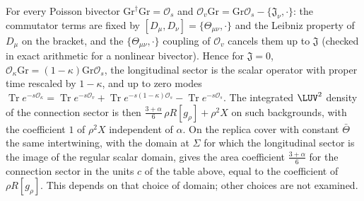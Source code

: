 For every Poisson bivector \(\mathrm{Gr}^\dagger\mathrm{Gr}=\mathcal O_s\) and \(\mathcal O_v\mathrm{Gr}=\mathrm{Gr}\mathcal O_s-\{\mathfrak J_\nu,\cdot\}\): the commutator terms are fixed by \([D_\mu,D_\nu]=\{\Theta_{\mu\nu},\cdot\}\) and the Leibniz property of \(D_\mu\) on the bracket, and the \(\{\Theta_{\mu\nu},\cdot\}\) coupling of \(\mathcal O_v\) cancels them up to \(\mathfrak J\) (checked in exact arithmetic for a nonlinear bivector). Hence for \(\mathfrak J=0\), \(\mathcal O_\kappa\mathrm{Gr}=(1-\kappa)\mathrm{Gr}\mathcal O_s\), the longitudinal sector is the scalar operator with proper time rescaled by \(1-\kappa\), and up to zero modes \(\operatorname{Tr}e^{-s\mathcal O_\kappa}=\operatorname{Tr}e^{-s\mathcal O_v}+\operatorname{Tr}e^{-s(1-\kappa)\mathcal O_s}-\operatorname{Tr}e^{-s\mathcal O_s}\). The integrated \(\LUV^2\) density of the connection sector is then \(\tfrac{3+\alpha}6\,\rho R[g_\rho]+\rho^2X\) on such backgrounds, with the coefficient \(1\) of \(\rho^2X\) independent of \(\alpha\). On the replica cover with constant \(\bar\Theta\) the same intertwining, with the domain at \(\Sigma\) for which the longitudinal sector is the image of the regular scalar domain, gives the area coefficient \(\tfrac{3+\alpha}6\) for the connection sector in the units \(c\) of the table above, equal to the coefficient of \(\rho R[g_\rho]\). This depends on that choice of domain; other choices are not examined.



